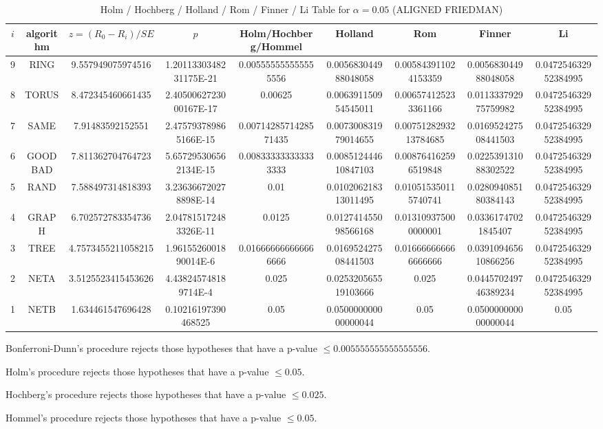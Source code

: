 \documentclass[a4paper,10pt]{article}
\begin{document}
\begin{landscape}
\newpage

\begin{table}[!htp]
\centering\scriptsize
\caption{Holm / Hochberg / Holland / Rom / Finner / Li Table for $\alpha=0.05$ (ALIGNED FRIEDMAN)}
\begin{tabular}{ccccccccc}
$i$&algorithm&$z=(R_0 - R_i)/SE$&$p$&Holm/Hochberg/Hommel&Holland&Rom&Finner&Li\\
\hline
9& RING&9.557949075974516&1.2011330348231175E-21&0.005555555555555556&0.005683044988048058&0.005843911024153359&0.005683044988048058&0.047254632952384995\\
8& TORUS&8.472345460661435&2.4050062723000167E-17&0.00625&0.006391150954545011&0.006574125233361166&0.011333792975759982&0.047254632952384995\\
7& SAME&7.91483592152551&2.475793789865166E-15&0.0071428571428571435&0.007300831979014655&0.0075128293213784685&0.016952427508441503&0.047254632952384995\\
6& GOODBAD&7.811362704764723&5.657295306562134E-15&0.008333333333333333&0.008512444610847103&0.008764162596519848&0.022539131088302522&0.047254632952384995\\
5& RAND&7.588497314818393&3.236366720278898E-14&0.01&0.010206218313011495&0.010515350115740741&0.028094085180384143&0.047254632952384995\\
4& GRAPH&6.702572783354736&2.047815172483326E-11&0.0125&0.012741455098566168&0.013109375000000001&0.03361747021845407&0.047254632952384995\\
3& TREE&4.7573455211058215&1.9615526001890014E-6&0.016666666666666666&0.016952427508441503&0.016666666666666666&0.039109465610866256&0.047254632952384995\\
2& NETA&3.5125523415453626&4.438245748189714E-4&0.025&0.025320565519103666&0.025&0.044570249746389234&0.047254632952384995\\
1& NETB&1.634461547696428&0.10216197390468525&0.05&0.050000000000000044&0.05&0.050000000000000044&0.05\\
\hline
\end{tabular}
\end{table}
Bonferroni-Dunn's procedure rejects those hypotheses that have a p-value $\le0.005555555555555556$.


Holm's procedure rejects those hypotheses that have a p-value $\le0.05$.


Hochberg's procedure rejects those hypotheses that have a p-value $\le0.025$.


Hommel's procedure rejects those hypotheses that have a p-value $\le0.05$.



\end{landscape}
\end{document}
